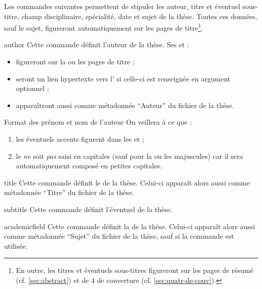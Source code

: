 Les commandes suivantes permettent de stipuler les auteur, titre et éventuel
sous-titre, champ disciplinaire, spécialité, date et sujet de la thèse. Toutes
ces données, sauf le sujet, figureront automatiquement sur les pages de
titre\footnote{En outre, les titres et éventuels sous-titres figureront sur les
  pages de résumé (cf. \vref{sec:abstract}) et de 4\ieme{} de couverture (cf.
  \vref{sec:quatr-de-couv}).}.
%
\begin{docCommand}[doc description=\mandatory]{author}{}
  Cette commande définit l'auteur de la thèse. Ses  et
   :
  \begin{itemize}
  \item figureront sur la ou les pages de titre ;
  \item seront un lien hypertexte vers l' si celle-ci
    est renseignée en argument optionnel ;
  \item apparaîtront aussi comme métadonnée \enquote{Auteur} du
    fichier \pdf de la thèse.
  \end{itemize}
  \begin{dbwarning}{Format des prénom et nom de l'auteur}{}
    On veillera à ce que :
    \begin{enumerate}
    \item les éventuels accents figurent dans les  et
      ;
    \item le  \emph{ne} soit \emph{pas} saisi en capitales
      (sauf pour la ou les majuscules) car il sera automatiquement
      composé en petites capitales.
    \end{enumerate}
  \end{dbwarning}
\end{docCommand}
%
\begin{docCommand}[doc description=\mandatory]{title}{}
  Cette commande définit le  de la thèse. Celui-ci apparaît alors
  aussi comme métadonnée \enquote{Titre} du fichier \pdf de la thèse.
\end{docCommand}
%
\begin{docCommand}{subtitle}{}
  Cette commande définit l'éventuel  de la thèse.
\end{docCommand}
%
\begin{docCommand}[doc description=\mandatory]{academicfield}{}
  Cette commande définit la  
  de la thèse. Celui-ci apparaît alors aussi comme métadonnée \enquote{Sujet} du
  fichier \pdf de la thèse, sauf si la commande  est utilisée.
\end{docCommand}
